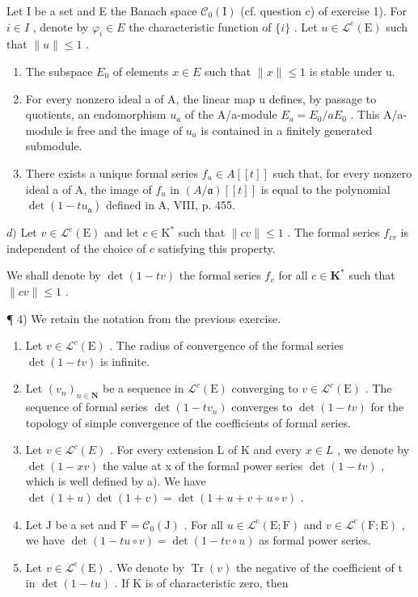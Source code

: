 Let I be a set and E the Banach space \(\mathcal{C}_{0}(\mathrm{I})\) (cf. question c) of exercise 1). For \(i \in I\) , denote by \(\varphi_{i} \in E\) the characteristic function of \(\{i\}\) . Let \(u \in \mathcal{L}^{\mathrm{c}}(\mathrm{E})\) such that \(\|u\| \leqslant 1\) .

\begin{enumerate}
\def\labelenumi{\alph{enumi})}
\item
  The subspace \(E_{0}\) of elements \(x \in E\) such that \(\|x\| \leqslant 1\) is stable under u.
\item
  For every nonzero ideal a of A, the linear map u defines, by passage to quotients, an endomorphism \(u_{a}\) of the A/a-module \(E_{a} = E_{0}/aE_{0}\) . This A/a-module is free and the image of \(u_{a}\) is contained in a finitely generated submodule.
\item
  There exists a unique formal series \(f_{u} \in A[[t]]\) such that, for every nonzero ideal a of A, the image of \(f_{u}\) in \((A/\mathfrak{a})[[t]]\) is equal to the polynomial \(\det(1 - tu_{\mathfrak{a}})\) defined in A, VIII, p. 455.
\end{enumerate}

\(d)\) Let \(v \in \mathcal{L}^{\mathrm{c}}(\mathrm{E})\) and let \(c \in \mathrm{K}^{*}\) such that \(\|cv\| \leqslant 1\) . The formal series \(f_{cv}\) is independent of the choice of \(c\) satisfying this property.

We shall denote by \(\det(1-tv)\) the formal series \(f_v\) for all \(c \in \mathbf{K}^*\) such that \(\|cv\| \leqslant 1\) .

¶ 4) We retain the notation from the previous exercise.

\begin{enumerate}
\def\labelenumi{\alph{enumi})}
\item
  Let \(v \in \mathcal{L}^c(\mathrm{E})\) . The radius of convergence of the formal series \(\det(1 - tv)\) is infinite.
\item
  Let \((v_{n})_{n\in\mathbf{N}}\) be a sequence in \(\mathcal{L}^{c}(\mathrm{E})\) converging to \(v\in\mathcal{L}^{c}(\mathrm{E})\) . The sequence of formal series \(\det(1-tv_{n})\) converges to \(\det(1-tv)\) for the topology of simple convergence of the coefficients of formal series.
\item
  Let \(v \in \mathcal{L}^{c}(E)\) . For every extension L of K and every \(x \in L\) , we denote by \(\det(1 - xv)\) the value at x of the formal power series \(\det(1 - tv)\) , which is well defined by a). We have \(\det(1 + u)\det(1 + v) = \det(1 + u + v + u \circ v)\) .
\item
  Let J be a set and \(\mathrm{F} = \mathcal{C}_{0}(\mathrm{J})\) . For all \(u \in \mathcal{L}^{\mathrm{c}}(\mathrm{E};\mathrm{F})\) and \(v \in \mathcal{L}^{\mathrm{c}}(\mathrm{F};\mathrm{E})\) , we have \(\det(1 - tu \circ v) = \det(1 - tv \circ u)\) as formal power series.
\item
  Let \(v \in \mathcal{L}^{\mathrm{c}}(\mathrm{E})\) . We denote by \(\operatorname{Tr}(v)\) the negative of the coefficient of t in \(\det(1 - tu)\) . If K is of characteristic zero, then
\end{enumerate}

